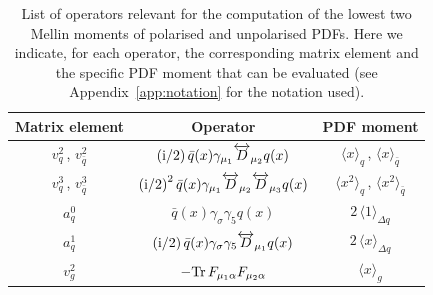 \begin{table}
\renewcommand{\arraystretch}{1.6} 
\centering
\begin{tabular}{@{}ccc@{}}
\hline 
Matrix element & Operator & PDF moment \\ 
\hline
$v_q^2$\,, $v_{\bar{q}}^2$  & $\displaystyle \left({\rm i}/2\right) \bar{q}(x)\gamma_{\mu_1} \overleftrightarrow{D}_{\mu_2} q(x)$ & $\langle x \rangle_q$\,, $\langle x \rangle_{\bar{q}}$   \\
$v_q^3$\,, $v_{\bar{q}}^3$  & $\displaystyle \left({\rm i}/2\right)^2 \bar{q}(x)\gamma_{\mu_1} \overleftrightarrow{D}_{\mu_2} \overleftrightarrow{D}_{\mu_3} q(x)$ & $\langle x^2 \rangle_q$\,, $\langle x^2 \rangle_{\bar{q}}$ \\
$a_q^0$ & $\displaystyle \bar{q}(x)\gamma_{\sigma} \gamma_5 q(x)$ & $2\, \langle 1 \rangle_{\Delta q}$ \\
$a_q^1$ & $\displaystyle \left({\rm i}/2\right) \bar{q}(x)\gamma_{\sigma} \gamma_5 \overleftrightarrow{D}_{\mu_1} q(x)$ & $2\, \langle x \rangle_{\Delta q}$ \\
$v_g^2$ & $\displaystyle - {\rm Tr}\, F_{\mu_1\alpha}F_{\mu_2\alpha}$ & $\langle x \rangle_g$ \\
\hline
\end{tabular}
\caption{\label{Tab:twist2}
\small List of operators relevant for
the computation of the lowest two Mellin moments of polarised and unpolarised PDFs.
%
Here we indicate, for each operator, the corresponding matrix element and
the specific PDF moment that can be evaluated (see
Appendix~\ref{app:notation} for the notation used).
}
\end{table}


